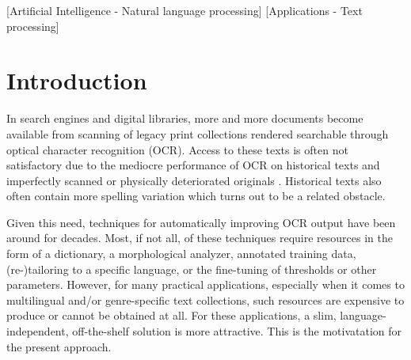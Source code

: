 \documentclass{sig-alternate}
\begin{document}
\maketitle
\begin{abstract}
  The accuracy of Optical Character Recognition (OCR) is sets the
  limit for the success of subsequent applications used in text
  analyzing pipeline. Recent models of OCR post-processing
  significantly improve the quality of OCR-generated text but require
  engineering work or resources such as human-labeled data or a
  dictionary to perform with such accuracy on novel datasets.  In the
  present paper we introduce a technique for OCR post-processing that
  runs off-the-shelf with no resources or parameter tuning required.
  In essence, words which are similar in form that are also
  distributionally more similar than expected at random are deemed
  OCR-variants. As such it can be applied to any language or genre (as
  long as the orthography segments the language at the word-level).
  The algorithm is illustrated and evaluated using a multilingual
  document collection and a benchmark English dataset.
\end{abstract}

[Artificial Intelligence - Natural language processing]
[Applications - Text
processing]




\section{Introduction}
In search engines and digital libraries, more and more documents
become available from scanning of legacy print collections rendered
searchable through optical character recognition (OCR). Access to
these texts is often not satisfactory due to the mediocre performance
of OCR on historical texts and imperfectly scanned or physically
deteriorated originals \cite{ocr:Taghva,ocr:Traub}.  Historical texts
also often contain more spelling variation which turns out to be a
related obstacle.

Given this need, techniques for automatically improving OCR output
have been around for decades. Most, if not all, of these techniques
require resources in the form of a dictionary, a morphological
analyzer, annotated training data, (re-)tailoring to a specific
language, or the fine-tuning of thresholds or other
parameters. However, for many practical applications, especially when
it comes to multilingual and/or genre-specific text collections, such
resources are expensive to produce or cannot be obtained at all.  For
these applications, a slim, language-independent, off-the-shelf
solution is more attractive. This is the motivatation for the present
approach.
\end{document}
